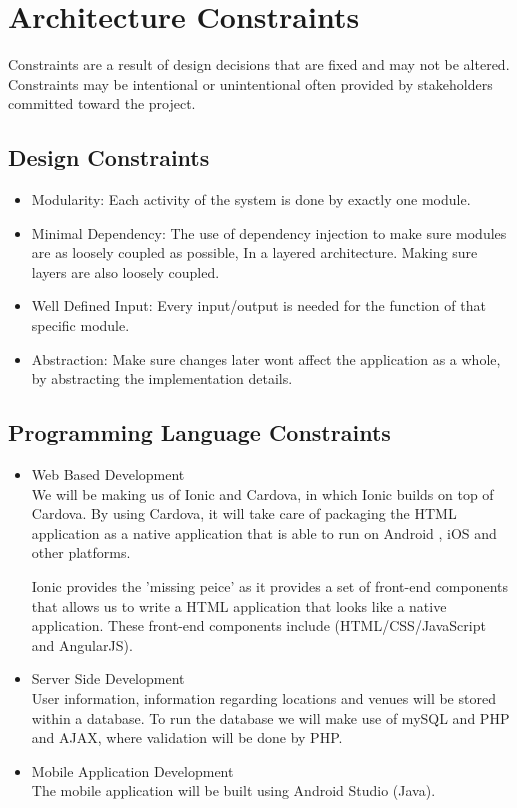 \documentclass{article}
\begin{document}
	\section{Architecture Constraints}
	Constraints are a result of design decisions that are fixed and may not be altered. Constraints may be intentional or unintentional often provided by stakeholders committed toward the project.
	
		\subsection{Design Constraints}
		\begin{itemize}
			\item Modularity:
			Each activity of the system is done by exactly one module. 
			
			\item Minimal Dependency:
			The use of dependency injection to make sure modules are as loosely coupled as possible, In a layered architecture. Making sure layers are also loosely coupled.
			
			\item Well Defined Input:
			Every input/output is needed for the function of that specific module.
			
			\item Abstraction:
			Make sure changes later wont affect the application as a whole, by abstracting the implementation details.
		\end{itemize}
		
		\subsection{Programming Language Constraints}
			\begin{itemize}
 				\item Web Based Development
 				\bigskip
 				\\ 				
 				We will be making us of Ionic and Cardova, in which Ionic builds on top of Cardova. By using Cardova, it will take care of packaging the HTML application as a native application that is able to run on Android , iOS and other platforms.
				
				Ionic provides the 'missing peice' as it provides a set of front-end components that allows us to write a HTML application that looks like a native application. These front-end components include (HTML/CSS/JavaScript and AngularJS).
 				
  				\item Server Side Development
  				\bigskip
				\\
 				User information, information regarding locations and venues will be stored within a database. To run the database we will make use of mySQL and PHP and AJAX, where validation will be done by PHP.
 				
 				\item Mobile Application  Development
  				\bigskip
 				\\
 				The mobile application will be built using Android Studio (Java).
 							
			\end{itemize}
\end{document}

